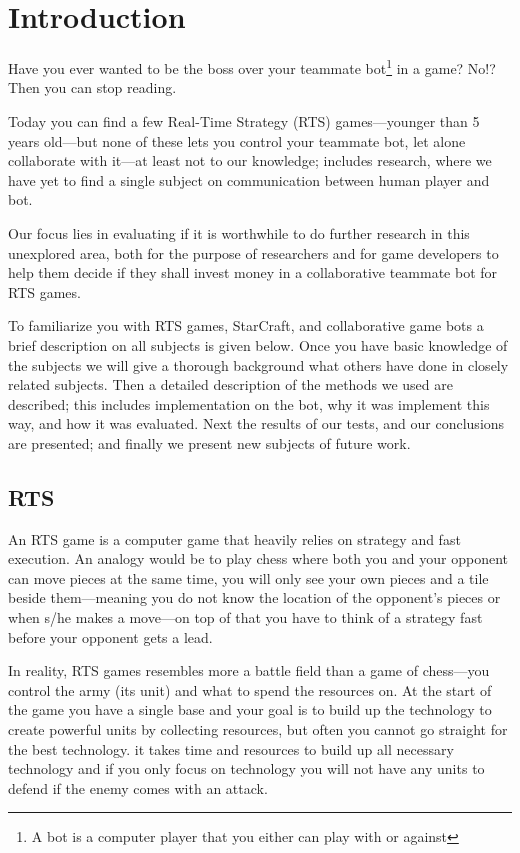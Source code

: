 \chapter{Introduction}
Have you ever wanted to be the boss over your teammate bot\footnote{A bot is a computer player that you either can play with or against} in a game? No!? Then you can stop reading.

Today you can find a few Real-Time Strategy (RTS) games—younger than 5 years old—but none of these lets you control your teammate bot, let alone collaborate with it—at least not to our knowledge; includes research, where we have yet to find a single subject on communication between human player and bot.

Our focus lies in evaluating if it is worthwhile to do further research in this unexplored area, both for the purpose of researchers and for game developers to help them decide if they shall invest money in a collaborative teammate bot for RTS games.

To familiarize you with RTS games, StarCraft, and collaborative game bots a brief description on all subjects is given below. Once you have basic knowledge of the subjects we will give a thorough background what others have done in closely related subjects. Then a detailed description of the methods we used are described; this includes implementation on the bot, why it was implement this way, and how it was evaluated. Next the results of our tests, and our conclusions are presented; and finally we present new subjects of future work.

\section{RTS}
An RTS game is a computer game that heavily relies on strategy and fast execution. An analogy would be to play chess where both you and your opponent can move pieces at the same time, you will only see your own pieces and a tile beside them—meaning you do not know the location of the opponent’s pieces or when s/he makes a move—on top of that you have to think of a strategy fast before your opponent gets a lead.

In reality, RTS games resembles more a battle field than a game of chess—you control the army (its unit) and what to spend the resources on. At the start of the game you have a single base and your goal is to build up the technology to create powerful units by collecting resources, but often you cannot go straight for the best technology. it takes time and resources to build up all necessary technology and if you only focus on technology you will not have any units to defend if the enemy comes with an attack.

